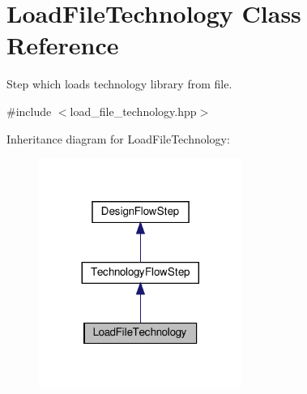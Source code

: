 \hypertarget{classLoadFileTechnology}{}\section{Load\+File\+Technology Class Reference}
\label{classLoadFileTechnology}


Step which loads technology library from file.  




{\ttfamily \#include $<$load\+\_\+file\+\_\+technology.\+hpp$>$}



Inheritance diagram for Load\+File\+Technology\+:
\nopagebreak
\begin{figure}[H]
\begin{center}
\leavevmode
\includegraphics[width=188pt]{de/d30/classLoadFileTechnology__inherit__graph}
\end{center}
\end{figure}


